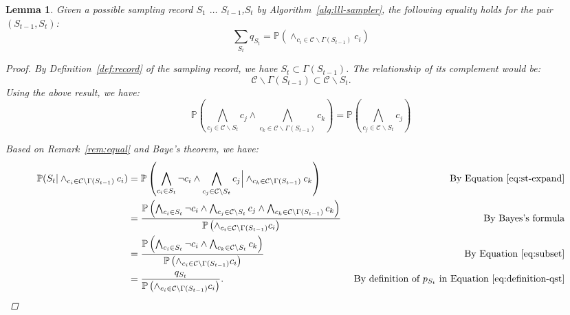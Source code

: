 \documentclass[letterpaper]{article} %
\newtheorem{lemma}{Lemma}
\newcommand{\p}{\mathbb{P}}
\begin{document}
\begin{lemma} \label{eq:pair-prob}
Given a possible sampling record $S_1$ $\ldots$ $S_{t-1}$,$S_t$ by Algorithm~\ref{alg:lll-sampler}, the following equality holds for the pair $(S_{t-1},S_t)$:
\begin{equation*}
\sum_{S_t}q_{S_t}=\p(\wedge_{c_i \in \mathcal{C}\backslash \Gamma(S_{t-1})}c_i)
\end{equation*}
\begin{proof}
By Definition~\ref{def:record} of the sampling record, we have $S_t \subset \Gamma(S_{t-1})$. The  relationship of its complement would be:
\begin{equation*}
\mathcal{C}\backslash\Gamma(S_{t-1})\subset \mathcal{C}\backslash S_t.
\end{equation*}
Using the above result, we have:
\begin{equation}\label{eq:subset}
\p\left(\bigwedge_{c_j \in \mathcal{C}\backslash S_t}c_j \wedge \bigwedge_{c_k \in \mathcal{C}\backslash \Gamma(S_{t-1})}c_k \right)=
\p\left(\bigwedge_{c_j \in \mathcal{C}\backslash S_t}c_j \right)
\end{equation}

Based on Remark~\ref{rem:equal} and Baye's theorem, we have:
\begin{equation} \label{eq:bayes}
\begin{aligned}
\p(S_t |\wedge_{c_i \in \mathcal{C}\backslash \Gamma(S_{t-1})}c_i)&=\p\left(\bigwedge_{c_i \in S_t}\neg{c}_i \wedge \bigwedge_{c_j \in \mathcal{C}\backslash S_t}c_j \Big| \wedge_{c_k \in \mathcal{C}\backslash \Gamma(S_{t-1})}c_k \right) & \text{ By Equation~\eqref{eq:st-expand}}\\
&=\frac{\p\left(\bigwedge_{c_i \in S_t}\neg{c}_i \wedge \bigwedge_{c_j \in \mathcal{C}\backslash S_t}c_j \wedge \bigwedge_{c_k \in \mathcal{C}\backslash \Gamma(S_{t-1})}c_k \right)}{\p \left(\wedge_{c_i \in \mathcal{C}\backslash \Gamma(S_{t-1})}c_i\right) } &\text{By Bayes's formula}\\
&=\frac{\p\left(\bigwedge_{c_i \in S_t}\neg{c}_i \wedge \bigwedge_{c_k \in \mathcal{C}\backslash S_{t}}c_k \right)}{\p \left(\wedge_{c_i \in \mathcal{C}\backslash \Gamma(S_{t-1})}c_i\right) } &\text{ By Equation~\eqref{eq:subset}}\\
&= \frac{q_{S_t} }{\p \left(\wedge_{c_i \in \mathcal{C}\backslash \Gamma(S_{t-1})}c_i\right) }. &\text{ By definition of $p_{S_t}$ in Equation~\eqref{eq:definition-qst}}
\end{aligned}
\end{equation}


\end{proof}
\end{lemma}
\end{document}

